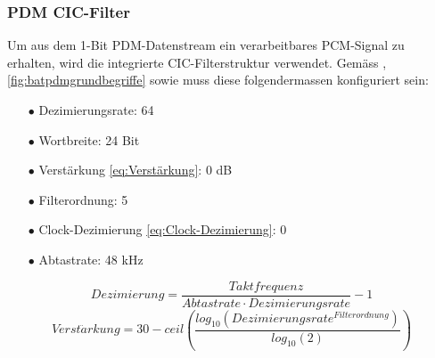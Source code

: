 \documentclass[12pt]{article}
\begin{document}
	\subsubsection*{PDM CIC-Filter}
	Um aus dem 1-Bit PDM-Datenstream ein verarbeitbares PCM-Signal zu erhalten, wird die integrierte CIC-Filterstruktur verwendet. Gemäss \cite{silicon_efr32xg22_2022}, \ref{fig:batpdmgrundbegriffe} sowie \cite{noauthor_httpsinvensensetdkcomwp-contentuploads202007ds-000157-ics-41351-v14pdf_nodate} muss diese folgendermassen konfiguriert sein:
	\begin{itemize}[topsep=10pt,partopsep=0pt,labelwidth=5cm,align=left,itemindent=5cm]
	\item[$\bullet$ Dezimierungsrate:] 64
	\item[$\bullet$ Wortbreite:]  24 Bit
	\item[$\bullet$ Verstärkung \ref{eq:Verstärkung}:]  0 dB 
	\item[$\bullet$ Filterordnung:]  5
	\item[$\bullet$ Clock-Dezimierung \ref{eq:Clock-Dezimierung}:]  0 
	\item[$\bullet$ Abtastrate:]  48 kHz
	\end{itemize}
	\begin{equation}\label{eq:Clock-Dezimierung}
		Dezimierung = \frac{Taktfrequenz}{Abtastrate \cdot Dezimierungsrate} - 1
	\end{equation}
	\begin{equation}\label{eq:Verstärkung}
		Verst\ddot{a}rkung = 30 - ceil \left( \dfrac{log_{10}\left(Dezimierungsrate^{Filterordnung}\right)}{log_{10}(2)}\right)
	\end{equation}
\end{document}
